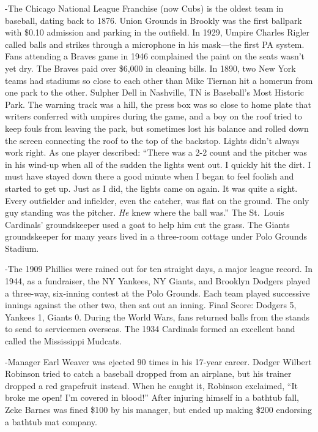 \documentclass[
]{article}
\begin{document}
-The Chicago National League Franchise (now Cubs) is the oldest team in
baseball, dating back to 1876. Union Grounds in Brookly was the first
ballpark with \$0.10 admission and parking in the outfield. In 1929,
Umpire Charles Rigler called balls and strikes through a microphone in
his mask---the first PA system. Fans attending a Braves game in 1946
complained the paint on the seats wasn't yet dry. The Braves paid over
\$6,000 in cleaning bills. In 1890, two New York teams had stadiums so
close to each other than Mike Tiernan hit a homerun from one park to the
other. Sulpher Dell in Nashville, TN is Baseball's Most Historic Park.
The warning track was a hill, the press box was so close to home plate
that writers conferred with umpires during the game, and a boy on the
roof tried to keep fouls from leaving the park, but sometimes lost his
balance and rolled down the screen connecting the roof to the top of the
backstop. Lights didn't always work right. As one player described:
``There was a 2-2 count and the pitcher was in his wind-up when all of
the sudden the lights went out. I quickly hit the dirt. I must have
stayed down there a good minute when I began to feel foolish and started
to get up. Just as I did, the lights came on again. It was quite a
sight. Every outfielder and infielder, even the catcher, was flat on the
ground. The only guy standing was the pitcher. \emph{He} knew where the
ball was.'' The St.~Louis Cardinals' groundskeeper used a goat to help
him cut the grass. The Giants groundskeeper for many years lived in a
three-room cottage under Polo Grounds Stadium.

-The 1909 Phillies were rained out for ten straight days, a major league
record. In 1944, as a fundraiser, the NY Yankees, NY Giants, and
Brooklyn Dodgers played a three-way, six-inning contest at the Polo
Grounds. Each team played successive innings against the other two, then
sat out an inning. Final Score: Dodgers 5, Yankees 1, Giants 0. During
the World Wars, fans returned balls from the stands to send to
servicemen overseas. The 1934 Cardinals formed an excellent band called
the Mississippi Mudcats.

-Manager Earl Weaver was ejected 90 times in his 17-year career. Dodger
Wilbert Robinson tried to catch a baseball dropped from an airplane, but
his trainer dropped a red grapefruit instead. When he caught it,
Robinson exclaimed, ``It broke me open! I'm covered in blood!'' After
injuring himself in a bathtub fall, Zeke Barnes was fined \$100 by his
manager, but ended up making \$200 endorsing a bathtub mat company.
\end{document}
